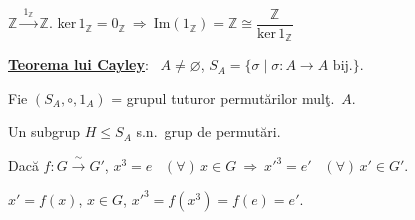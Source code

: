 \documentclass[12pt]{article}
\begin{document}
\bigskip
\noindent $\mathbb{Z} \xrightarrow{\ 1_{\mathbb{Z}}\ } \mathbb{Z}$. \quad ker$\,1_\mathbb{Z} = 0_\mathbb{Z} \ \Rightarrow \ \text{Im}(1_\mathbb{Z}) = \mathbb{Z} \cong \dfrac{\mathbb{Z}}{\text{ker}\,1_\mathbb{Z}}$

\bigskip
\noindent\underline{\textbf{Teorema lui Cayley}}: \ $A\neq\varnothing$, $S_A = \{\sigma \mid \sigma:A\to A \text{ bij.}\}$.

\bigskip
\noindent Fie $(S_A,\circ,1_A)$ = grupul tuturor permutărilor mulţ.\ $A$.

\noindent Un subgrup $H\leq S_A$ s.n.\ grup de permutări.

\bigskip
\noindent Dacă $f:G\xrightarrow{\ \sim\ }G'$, \quad $x^3=e$ \ $(\forall)\,x\in G \ \Rightarrow \ x'^3=e'$ \ $(\forall)\,x'\in G'$.

\noindent $x'=f(x)$, $x\in G$, \quad $x'^3 = f(x^3) = f(e) = e'$.
\end{document}
